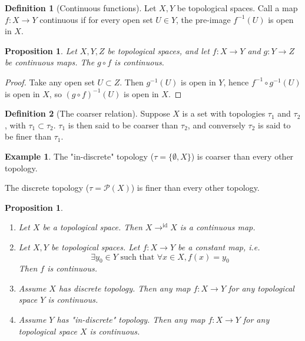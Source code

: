 \documentclass{article}
\theoremstyle{definition}
\newtheorem{defn}{Definition}[section]
\newtheorem{exmp}{Example}[section]
\theoremstyle{plain}%
\newtheorem{prop}[thm]{Proposition}
\theoremstyle{remark}
\begin{document}
\begin{defn}[Continuous functions]
Let $X,Y$ be topological spaces. Call a map $f: X \to Y$ continuous if for every open set $U \in Y$, the pre-image $f^{-1}(U)$ is open in $X$.
\end{defn}

\begin{prop}
Let $X,Y,Z$ be topological spaces, and let $f: X \to Y$ and $g : Y \to Z$ be continuous maps. The $g \circ f$ is continuous.
\end{prop}

\begin{proof}
Take any open set $U \subset Z$. Then $g^{-1}(U)$ is open in $Y$, hence $f^{-1} \circ g^{-1}(U)$ is open in $X$, so $(g \circ f)^{-1}(U)$ is open in $X$.
\end{proof}

\begin{defn}[The coarser relation]
Suppose $X$ is a set with topologies $\tau_1$ and $\tau_2$, with $\tau_1 \subset \tau_2$. $\tau_1$ is then said to be coarser than $\tau_2$, and conversely $\tau_2$ is said to be finer than $\tau_1$.
\end{defn}

\begin{exmp}
The "in-discrete" topology ($\tau = \{ \emptyset, X \}$) is coarser than every other topology. 

The discrete topology ($\tau = \mathcal{P}(X)$) is finer than every other topology. 
\end{exmp}

\begin{prop}
\begin{enumerate}
    \item Let $X$ be a topological space. Then $X \to^{\text{id}} X$ is a continuous map.
    \item Let $X, Y$ be topological spaces. Let $f : X \to Y$ be a constant map, i.e.
    \[ \exists y_0 \in Y \text{ such that } \forall x \in X, f(x) = y_0 \]
    Then $f$ is continuous.
    \item Assume $X$ has discrete topology. Then any map $f: X \to Y$ for any topological space $Y$ is continuous.
    \item Assume $Y$ has "in-discrete" topology. Then any map $f: X \to Y$ for any topological space $X$ is continuous.
\end{enumerate}
\end{prop}
\end{document}
